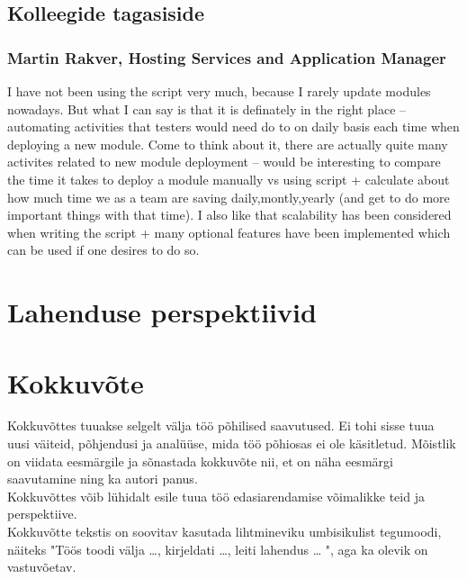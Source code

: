 \documentclass[12pt]{report}
\begin{document}
  \subsection{Kolleegide tagasiside}
  
  \subsubsection{Martin Rakver, Hosting Services and Application Manager}
  I have not been using the script very much, because I rarely update modules nowadays. But what I can say is that it is definately in the right place – automating activities that testers would need do to on daily basis each time when deploying a new module. Come to think about it, there are actually quite many activites related to new module deployment – would be interesting to compare the time it takes to deploy a module manually vs using script + calculate about how much time we as a team are saving daily,montly,yearly  (and get to do more important things with that time).
I also like that scalability has been considered when writing the script + many optional features have been implemented which can be used if one desires to do so.
  
  \section{Lahenduse perspektiivid}
  
  \newpage
  
  \section*{Kokkuvõte}
  \label{kokkuvote}

Kokkuvõttes tuuakse selgelt välja töö põhilised saavutused. Ei tohi sisse tuua uusi väiteid, põhjendusi ja analüüse, mida töö põhiosas ei ole käsitletud. Mõistlik on viidata eesmärgile ja sõnastada kokkuvõte nii, et on näha eesmärgi saavutamine ning ka autori panus.\\

Kokkuvõttes võib lühidalt esile tuua töö edasiarendamise võimalikke teid ja perspektiive.\\

Kokkuvõtte tekstis on soovitav kasutada lihtmineviku umbisikulist tegumoodi, näiteks "Töös toodi välja …, kirjeldati …, leiti lahendus … ", aga ka olevik on vastuvõetav.
\end{document}
